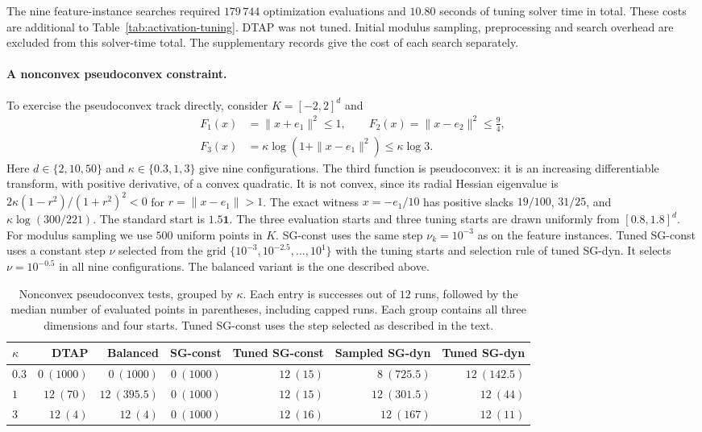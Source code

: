 \documentclass[]{interact}
\theoremstyle{plain}
\theoremstyle{definition}
\theoremstyle{remark}
\begin{document}
The nine feature-instance searches required $179\,744$ optimization evaluations and $10.80$ seconds of tuning solver time in total. These costs are additional to Table~\ref{tab:activation-tuning}. DTAP was not tuned. Initial modulus sampling, preprocessing and search overhead are excluded from this solver-time total. The supplementary records give the cost of each search separately.

\paragraph*{A nonconvex pseudoconvex constraint.}
To exercise the pseudoconvex track directly, consider $K=[-2,2]^d$ and
\begin{equation}\label{eq:logball-test}
\begin{aligned}
 F_1(x)&=\|x+e_1\|^2\le1,\qquad
 F_2(x)=\|x-e_2\|^2\le\tfrac94,\\
 F_3(x)&=\kappa\log(1+\|x-e_1\|^2)\le \kappa\log3.
\end{aligned}
\end{equation}
Here $d\in\{2,10,50\}$ and $\kappa\in\{0.3,1,3\}$ give nine configurations. The third function is pseudoconvex: it is an increasing differentiable transform, with positive derivative, of a convex quadratic. It is not convex, since its radial Hessian eigenvalue is $2\kappa(1-r^2)/(1+r^2)^2<0$ for $r=\|x-e_1\|>1$. The exact witness $x=-e_1/10$ has positive slacks $19/100$, $31/25$, and $\kappa\log(300/221)$. The standard start is $1.5\mathbf1$. The three evaluation starts and three tuning starts are drawn uniformly from $[0.8,1.8]^d$. For modulus sampling we use $500$ uniform points in $K$. SG-const uses the same step $\nu_k=10^{-3}$ as on the feature instances. Tuned SG-const uses a constant step $\nu$ selected from the grid $\{10^{-3},10^{-2.5},\ldots,10^1\}$ with the tuning starts and selection rule of tuned SG-dyn. It selects $\nu=10^{-0.5}$ in all nine configurations. The balanced variant is the one described above.

\begin{table}[t]
\centering\small
\setlength{\tabcolsep}{5pt}
\caption{Nonconvex pseudoconvex tests, grouped by $\kappa$.
Each entry is successes out of $12$ runs, followed by the median number
of evaluated points in parentheses, including capped runs. Each group
contains all three dimensions and four starts. Tuned SG-const uses the step
selected as described in the text.}
\label{tab:synthetic-scale}
\begin{tabular}{@{}lrrrrrr@{}}
\toprule
$\kappa$ & DTAP & Balanced & SG-const & Tuned SG-const & Sampled SG-dyn & Tuned SG-dyn\\
\midrule
$0.3$ & $0\ (1000)$ & $0\ (1000)$ & $0\ (1000)$ & $12\ (15)$ & $8\ (725.5)$ & $12\ (142.5)$\\
$1$   & $12\ (70)$ & $12\ (395.5)$ & $0\ (1000)$ & $12\ (15)$ & $12\ (301.5)$ & $12\ (44)$\\
$3$   & $12\ (4)$ & $12\ (4)$ & $0\ (1000)$ & $12\ (16)$ & $12\ (167)$ & $12\ (11)$\\
\bottomrule
\end{tabular}
\end{table}
\end{document}
